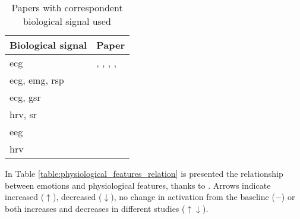 \begin{table}[h!]
	\centering
	\begin{tabular}{|l|l|}
		\hline
		Biological signal & Paper\\ [0.5ex] 
		\hline \hline \gls{ecg} & \cite{dissanayake2019ensemble}, \cite{hsu2017automatic},  \cite{naji2014classification}, \cite{naji2015emotion}, \cite{cai2009research}  \\ 
		\hline \gls{ecg}, \gls{emg}, \gls{rsp} & \cite{kim2008emotion} \\
		\hline \gls{ecg}, \gls{gsr} & \cite{goshvarpour2017accurate} \\ 
		\hline \gls{hrv}, \gls{sr} & \cite{yoo2005neural} \\
		\hline \gls{eeg} & \cite{sourina2012real} \\
		\hline \gls{hrv} & \cite{nardelli2015recognizing} \\
		\hline
	\end{tabular}
	\caption{Papers with correspondent biological signal used}
	\label{table:biological_signals}
\end{table}
\newpage
In Table \ref{table:physiological_features_relation} is presented the relationship between emotions and physiological features, thanks to \cite{shu2018review}. Arrows indicate increased ($\uparrow$), decreased ($\downarrow$), no change in activation from the baseline ($-$) or both increases and decreases in different studies ($\uparrow\downarrow$).
